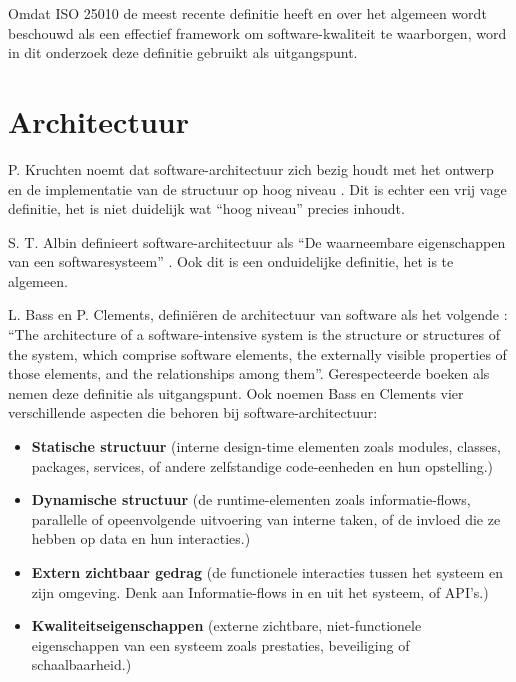 Omdat ISO 25010 \parencite{ISO25010} de meest recente definitie heeft en over het algemeen wordt beschouwd als een effectief framework om software-kwaliteit te waarborgen, word in dit onderzoek deze definitie gebruikt als uitgangspunt.

\section{Architectuur}
P. Kruchten noemt dat software-architectuur zich bezig houdt met het ontwerp en de implementatie van de structuur op hoog niveau \parencite{4plus1}. Dit is echter een vrij vage definitie, het is niet duidelijk wat \enquote{hoog niveau} precies inhoudt.

S. T. Albin definieert software-architectuur als \enquote{De waarneembare eigenschappen van een softwaresysteem} \parencite{ArtOfArchitecture}. Ook dit is een onduidelijke definitie, het is te algemeen.

L. Bass en P. Clements, definiëren de architectuur van software als het volgende \parencite{ArchitectureInPractice}: \enquote{The architecture of a software-intensive system is the structure or structures of the system, which comprise software elements, the externally visible properties of those elements, and the relationships among them}. Gerespecteerde boeken als \parencite{ArchitectureStakeholders, DesigningArchitectures} nemen deze definitie als uitgangspunt. Ook noemen Bass en Clements vier verschillende aspecten die behoren bij software-architectuur:
\begin{itemize}
	\item \textbf{Statische structuur} (interne design-time elementen zoals modules, classes, packages, services, of andere zelfstandige code-eenheden en hun opstelling.)
	\item \textbf{Dynamische structuur} (de runtime-elementen zoals informatie-flows, parallelle of opeenvolgende uitvoering van interne taken, of de invloed die ze hebben op data en hun interacties.)
	\item \textbf{Extern zichtbaar gedrag} (de functionele interacties tussen het systeem en zijn omgeving. Denk aan Informatie-flows in en uit het systeem, of API's.)
	\item \textbf{Kwaliteitseigenschappen} (externe zichtbare, niet-functionele eigenschappen van een systeem zoals prestaties, beveiliging of schaalbaarheid.)
\end{itemize}

